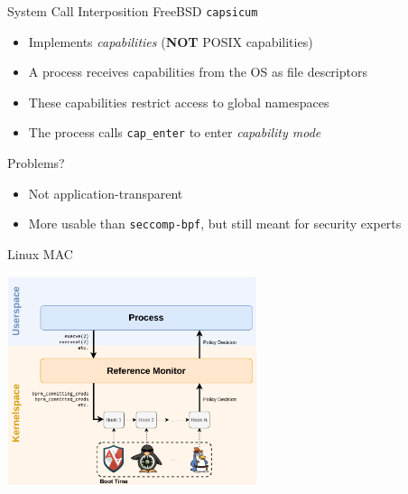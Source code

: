 \documentclass[12pt, dvipsnames, aspectratio=169]{beamer}
\begin{document}
\begin{frame}[c]{System Call Interposition}
FreeBSD \texttt{capsicum}
\begin{itemize}
    \item Implements \textit{capabilities} (\textbf{NOT} POSIX capabilities)
    \item A process receives capabilities from the OS as file descriptors
    \item These capabilities restrict access to global namespaces
    \item The process calls \texttt{cap\_enter} to enter \textit{capability mode}
\end{itemize}
\vfill
Problems?
\begin{itemize}
    \item Not application-transparent
    \item More usable than \texttt{seccomp-bpf}, but still meant for security experts
\end{itemize}
\end{frame}

\begin{frame}[c]{Linux MAC}
\begin{center}
    \color{black}
    \includegraphics[width=0.55\textwidth]{figs/lsm.pdf}
\end{center}
\end{frame}
\end{document}
